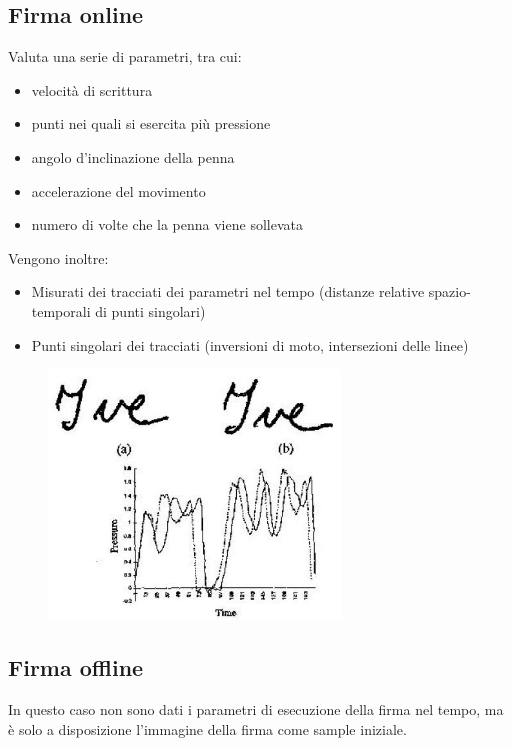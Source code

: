 \documentclass{report}
\begin{document}
\subsection{Firma online}
Valuta una serie di parametri, tra cui:
\begin{itemize}
    \item velocità di scrittura
    \item punti nei quali si esercita più pressione 
    \item angolo d'inclinazione della penna 
    \item accelerazione del movimento 
    \item numero di volte che la penna viene sollevata
\end{itemize}

\noindent Vengono inoltre:
\begin{itemize}
    \item Misurati dei tracciati dei parametri nel tempo (distanze relative spazio-temporali di punti singolari)
    \item Punti singolari dei tracciati (inversioni di moto, intersezioni delle linee)
\end{itemize}

\begin{figure}[H]
    \centering
    \includegraphics[width=0.5\linewidth]{images/firma-online.png}
\end{figure}

\subsection{Firma offline}
In questo caso non sono dati i parametri di esecuzione della firma nel tempo, ma è solo a disposizione l’immagine
della firma come sample iniziale.
\end{document}
